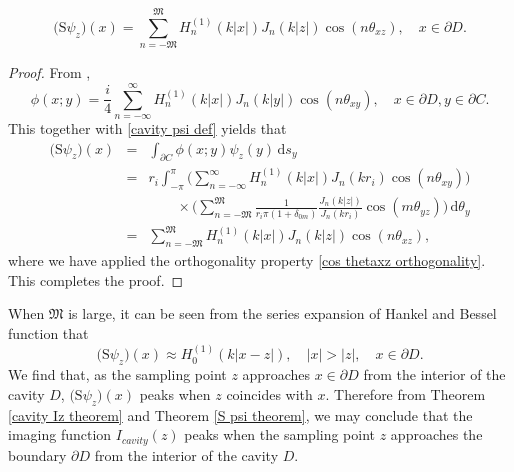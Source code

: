 \documentclass[final]{siamltex}
\newcommand{\ind}{\,\mbox{d}}
\begin{document}
\begin{theorem} \label{S psi theorem}
\begin{equation}
\Big( \mathrm{S} \psi_z \Big) (x) =  \sum_{n=-\mathfrak{M}}^{\mathfrak{M}} H_n^{(1)}(k|x|) J_n(k|z|) \cos(n\theta_{xz}), \quad x\in \partial D.
\end{equation}
\end{theorem}
\begin{proof}
From \cite{CaCo,CK},
\begin{equation*}
\phi(x;y) = \frac{i}{4} \sum_{n=-\infty}^\infty H_n^{(1)}(k|x|) J_n(k|y|) \cos(n\theta_{xy}), \quad x\in\partial D, y\in \partial C.
\end{equation*}
This together with \eqref{cavity psi def} yields that
\begin{eqnarray*}
\Big( \mathrm{S} \psi_z \Big) (x) &=&  \int_{\partial C} \phi(x;y) \psi_z(y) \ind s_y \\
&=& r_i \int_{-\pi}^\pi \Big(\sum_{n=-\infty}^\infty H_n^{(1)}(k|x|) J_n(kr_i) \cos(n\theta_{xy})  \Big) \\
&&\qquad \times \Big(\sum_{n=-\mathfrak{M}}^{\mathfrak{M}} \frac{1}{r_i\pi(1+\delta_{0m})}\frac{J_n(k|z|)}{J_n(kr_i)} \cos(m\theta_{yz}) \Big) \ind \theta_y \\
&=&  \sum_{n=-\mathfrak{M}}^{\mathfrak{M}} H_n^{(1)}(k|x|)   J_n(k|z|) \cos(n\theta_{xz}),  \end{eqnarray*}
where we have applied the orthogonality property  \eqref{cos thetaxz orthogonality}.
This completes the proof.
\end{proof}

When {\footnotesize $\mathfrak{M}$} is large, it can be seen from the series expansion of Hankel and Bessel function that
\begin{equation}
\Big( \mathrm{S} \psi_z \Big) (x) \approx
H_0^{(1)}(k|x-z|), \quad |x|>|z|,
\quad x\in \partial D.
\end{equation}
We find that, as the sampling point $z$ approaches $x \in \partial D$ from the interior of the cavity $D$, $\big(\mathrm{S}\psi_z\big)(x)$ peaks  when $z$ coincides with $x$.
Therefore from Theorem \ref{cavity Iz theorem} and Theorem \ref{S psi theorem}, we may conclude that  the imaging function $I_{cavity}(z)$ peaks  when  the sampling point $z$ approaches the boundary $\partial D$ from the interior of the cavity $D$.
\end{document}
